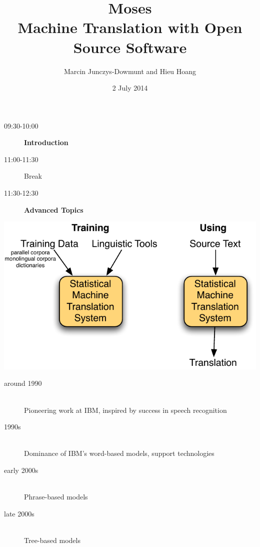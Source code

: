 \documentclass[landscape]{uedslides2C}
\begin{document}
\title[Machine Translation with Open Source Software]{{\sc \huge Moses}\\[3mm] Machine Translation with Open Source Software}
\author[Junczys-Dowmunt and Hoang]{Marcin Junczys-Dowmunt and Hieu Hoang}
\date{\vspace{-5mm}2 July 2014}
\maketitle


\vspace{20mm}

\begin{description}
\item[\small 09:30-10:00 $\;\;$] {\bf Introduction}
\item[\small 11:00-11:30 $\;\;$] Break
\item[\small 11:30-12:30 $\;\;$] {\bf Advanced Topics}
\end{description}


\vspace{15mm}
\begin{center}
\includegraphics[scale=1.8]{basics.pdf}
\end{center}


\vspace{10mm}
\begin{description}
\item[around 1990] $\;$\\[2mm] Pioneering work at IBM, inspired by success in speech recognition
\item[1990s] $\;$\\[2mm] Dominance of IBM's word-based models, support technologies
\item[early 2000s] $\;$\\[2mm] Phrase-based models
\item[late 2000s] $\;$\\[2mm] Tree-based models
\end{description}
\end{document}
